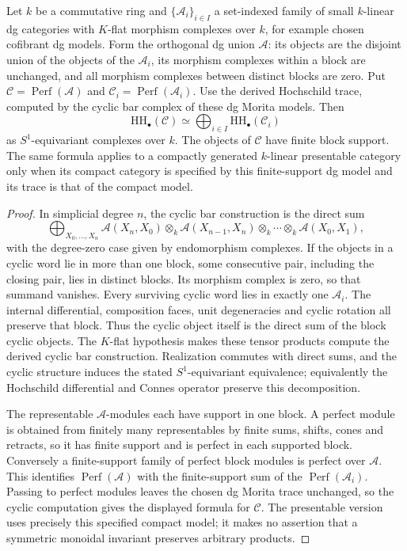 \begin{lemma}
\label{v4-arith:w5-f:F1a3-AB:lem:HH-block-additive}
Let \(k\) be a commutative ring and
\(\{\mathcal A_i\}_{i\in I}\) a set-indexed family of small
\(k\)-linear dg categories with \(K\)-flat morphism complexes over
\(k\), for example chosen cofibrant dg models. Form the orthogonal
dg union \(\mathcal A\): its objects are the disjoint union of the
objects of the \(\mathcal A_i\), its morphism complexes within a
block are unchanged, and all morphism complexes between distinct
blocks are zero. Put \(\mathcal C=\operatorname{Perf}(\mathcal A)\)
and \(\mathcal C_i=\operatorname{Perf}(\mathcal A_i)\).
Use the derived Hochschild trace, computed by the cyclic bar complex
of these dg Morita models. Then
\begin{equation}
\label{v4-arith:w5-f:F1a3-AB:eq:HH-block-additive}
 \mathrm{HH}_{\bullet}(\mathcal C)
 \simeq\bigoplus_{i\in I}\mathrm{HH}_{\bullet}(\mathcal C_i)
\end{equation}
as \(S^1\)-equivariant complexes over \(k\).
The objects of \(\mathcal C\) have finite block support. The same
formula applies to a compactly generated \(k\)-linear presentable
category only when its compact category is specified by this
finite-support dg model and its trace is that of the compact model.
\end{lemma}
\begin{proof}
In simplicial degree \(n\), the cyclic bar construction is the direct sum
\[
 \bigoplus_{X_0,\ldots,X_n}
 \mathcal A(X_n,X_0)\otimes_k\mathcal A(X_{n-1},X_n)
 \otimes_k\cdots\otimes_k\mathcal A(X_0,X_1),
\]
with the degree-zero case given by endomorphism complexes. If the
objects in a cyclic word lie in more than one block, some consecutive
pair, including the closing pair, lies in distinct blocks. Its morphism
complex is zero, so that summand vanishes. Every surviving cyclic
word lies in exactly one \(\mathcal A_i\). The internal differential,
composition faces, unit degeneracies and cyclic rotation all preserve
that block. Thus the cyclic object itself is the direct sum of the
block cyclic objects. The \(K\)-flat hypothesis makes these tensor
products compute the derived cyclic bar construction. Realization
commutes with direct sums, and the cyclic structure induces the
stated \(S^1\)-equivariant equivalence; equivalently the Hochschild
differential and Connes operator preserve this decomposition.

The representable \(\mathcal A\)-modules each have support in one
block. A perfect module is obtained from finitely many representables
by finite sums, shifts, cones and retracts, so it has finite support
and is perfect in each supported block. Conversely a finite-support
family of perfect block modules is perfect over \(\mathcal A\).
This identifies \(\operatorname{Perf}(\mathcal A)\) with the
finite-support sum of the \(\operatorname{Perf}(\mathcal A_i)\).
Passing to perfect modules leaves the chosen dg Morita trace unchanged,
so the cyclic computation gives the displayed formula for \(\mathcal C\).
The presentable version uses precisely this specified compact model;
it makes no assertion that a symmetric monoidal invariant preserves
arbitrary products.
\end{proof}


